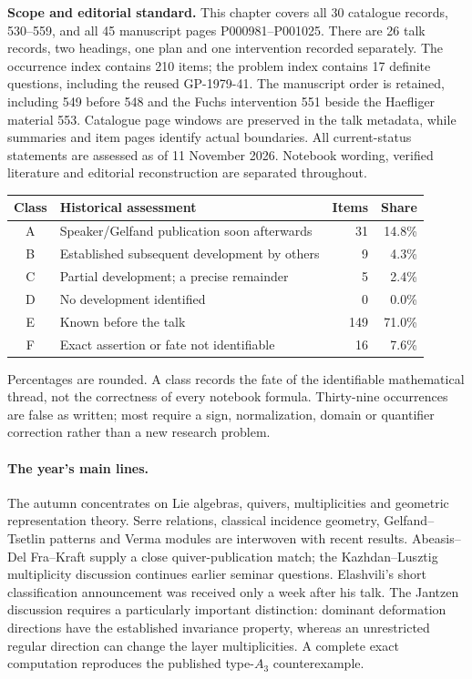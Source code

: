 \noindent\textbf{Scope and editorial standard.}
This chapter covers all 30 catalogue records, 530--559, and all 45 manuscript
pages P000981--P001025. There are 26 talk records, two headings, one plan and
one intervention recorded separately. The occurrence index contains 210
items; the problem index contains 17 definite questions, including the reused
GP-1979-41. The manuscript order is retained, including 549 before 548 and
the Fuchs intervention 551 beside the Haefliger material 553. Catalogue page
windows are preserved in the talk metadata, while summaries and item pages
identify actual boundaries. All current-status statements are assessed as of
11 November 2026. Notebook wording, verified literature and editorial
reconstruction are separated throughout.

\begin{center}
\begin{tabular}{clrr}
\toprule
Class&Historical assessment&Items&Share\\
\midrule
A&Speaker/Gelfand publication soon afterwards&31&14.8\%\\
B&Established subsequent development by others&9&4.3\%\\
C&Partial development; a precise remainder&5&2.4\%\\
D&No development identified&0&0.0\%\\
E&Known before the talk&149&71.0\%\\
F&Exact assertion or fate not identifiable&16&7.6\%\\
\bottomrule
\end{tabular}
\end{center}
\noindent Percentages are rounded. A class records the fate of the identifiable
mathematical thread, not the correctness of every notebook formula. Thirty-nine
occurrences are false as written; most require a sign, normalization, domain
or quantifier correction rather than a new research problem.

\paragraph{The year's main lines.}
The autumn concentrates on Lie algebras, quivers, multiplicities and
geometric representation theory. Serre relations, classical incidence
geometry, Gelfand--Tsetlin patterns and Verma modules are interwoven with
recent results. Abeasis--Del Fra--Kraft supply a close quiver-publication
match; the Kazhdan--Lusztig multiplicity discussion continues earlier
seminar questions. Elashvili's short classification announcement was received
only a week after his talk. The Jantzen discussion requires a particularly
important distinction: dominant deformation directions have the established
invariance property, whereas an unrestricted regular direction can change
the layer multiplicities. A complete exact computation reproduces the
published type-$A_3$ counterexample.

